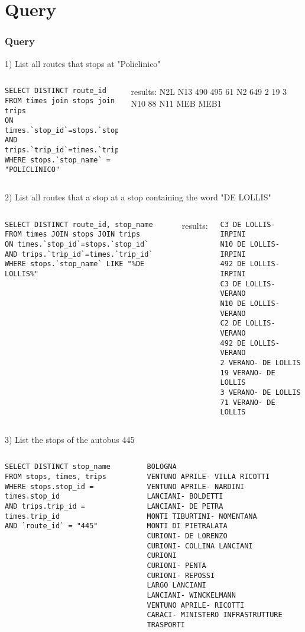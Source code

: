 \documentclass{beamer}
\begin{document}
\section{Query}
\begin{frame}[fragile]
\frametitle{Query}
1) List all routes that stops at "Policlinico"
\begin{columns}
\begin{lstlisting}
SELECT DISTINCT route_id
FROM times join stops join trips 
ON times.`stop_id`=stops.`stop_id` 
AND trips.`trip_id`=times.`trip_id`
WHERE stops.`stop_name` = "POLICLINICO"
\end{lstlisting}
results:
N2L
N13
490
495
61
N2
649
2
19
3
N10
88
N11
MEB
MEB1
\end{columns}
\end{frame}
\begin{frame}[fragile]
2) List all routes that a stop at a stop containing the word "DE
LOLLIS" 
\begin{columns}
\begin{lstlisting}
SELECT DISTINCT route_id, stop_name 
FROM times JOIN stops JOIN trips 
ON times.`stop_id`=stops.`stop_id` 
AND trips.`trip_id`=times.`trip_id`
WHERE stops.`stop_name` LIKE "%DE LOLLIS%"
\end{lstlisting}
results: 
\begin{verbatim}
C3 DE LOLLIS- IRPINI
N10 DE LOLLIS- IRPINI
492 DE LOLLIS- IRPINI
C3 DE LOLLIS- VERANO
N10 DE LOLLIS- VERANO
C2 DE LOLLIS- VERANO
492 DE LOLLIS- VERANO
2 VERANO- DE LOLLIS
19 VERANO- DE LOLLIS
3 VERANO- DE LOLLIS
71 VERANO- DE LOLLIS
\end{verbatim}
\end{columns}
\end{frame}
\begin{frame}[fragile]
 3) List the stops of the autobus 445
 \begin{columns}
   \begin{lstlisting}
SELECT DISTINCT stop_name
FROM stops, times, trips
WHERE stops.stop_id = times.stop_id
AND trips.trip_id = times.trip_id
AND `route_id` = "445"
\end{lstlisting}
\small
\begin{verbatim}
BOLOGNA
VENTUNO APRILE- VILLA RICOTTI
VENTUNO APRILE- NARDINI
LANCIANI- BOLDETTI
LANCIANI- DE PETRA
MONTI TIBURTINI- NOMENTANA
MONTI DI PIETRALATA
CURIONI- DE LORENZO
CURIONI- COLLINA LANCIANI
CURIONI
CURIONI- PENTA
CURIONI- REPOSSI
LARGO LANCIANI
LANCIANI- WINCKELMANN
VENTUNO APRILE- RICOTTI
CARACI- MINISTERO INFRASTRUTTURE TRASPORTI
\end{verbatim}
 \end{columns}
\end{frame}
\end{document}
